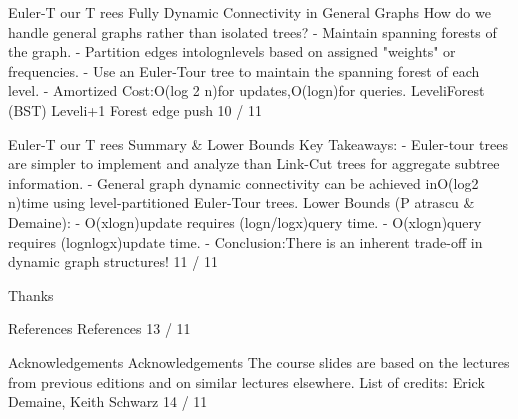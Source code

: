 \begin{description}[leftmargin=!,labelwidth=4.2em,style=nextline]
\item[Pag. 10] Euler-T our T rees Fully Dynamic Connectivity in General Graphs How do we handle general graphs rather than isolated trees? - Maintain spanning forests of the graph. - Partition edges intolognlevels based on assigned "weights" or frequencies. - Use an Euler-Tour tree to maintain the spanning forest of each level. - Amortized Cost:O(log 2 n)for updates,O(logn)for queries. LeveliForest (BST) Leveli+1 Forest edge push 10 / 11
\item[Pag. 11] Euler-T our T rees Summary \& Lower Bounds Key Takeaways: - Euler-tour trees are simpler to implement and analyze than Link-Cut trees for aggregate subtree information. - General graph dynamic connectivity can be achieved inO(log2 n)time using level-partitioned Euler-Tour trees. Lower Bounds (P atrascu \& Demaine): - O(xlogn)update requires (logn/logx)query time. - O(xlogn)query requires (lognlogx)update time. - Conclusion:There is an inherent trade-off in dynamic graph structures! 11 / 11
\item[Pag. 12] Thanks
\item[Pag. 13] References References 13 / 11
\item[Pag. 14] Acknowledgements Acknowledgements The course slides are based on the lectures from previous editions and on similar lectures elsewhere. List of credits: Erick Demaine, Keith Schwarz 14 / 11
\end{description}

